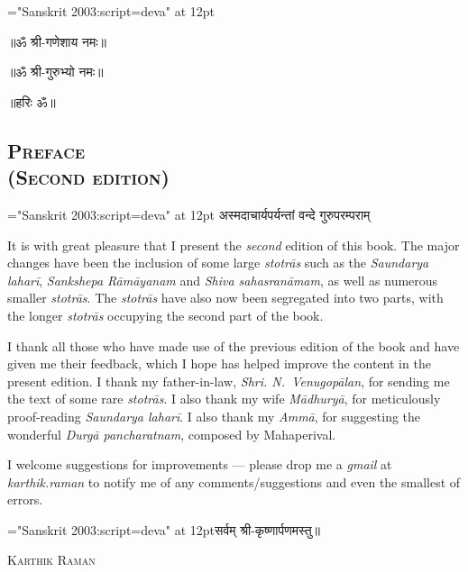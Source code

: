 {\font \x="Sanskrit 2003:script=deva" at 12pt\x
\centerline{॥ॐ श्री-गणेशाय नमः॥}
\centerline{॥ॐ श्री-गुरुभ्यो नमः॥}
\centerline{॥हरिः ॐ॥}
}
\thispagestyle{empty}

\begin{center}
\chapter*{\texorpdfstring{\scshape{Preface\\(Second edition)}}{Preface\\(Second edition)}}
\end{center}

{\font \x="Sanskrit 2003:script=deva" at 12pt\x
{}
{अस्मदाचार्यपर्यन्तां वन्दे गुरुपरम्पराम्}
}

It is with great pleasure that I present the \emph{second} edition of this book. The major changes  have been the inclusion of some large \emph{stotrās} such as the \emph{Saundarya laharī}, \emph{Sankshepa Rāmāyanam} and \emph{Shiva sahasranāmam}, as well as numerous smaller \emph{stotrās}. The \emph{stotrās} have also now been segregated into two parts, with the longer \emph{stotrās} occupying the second part of the book.

I thank all those who have made use of the previous edition of the book and have given me their feedback, which I hope has helped improve the content in the present edition. I thank my father-in-law, \textit{Shri. N.~Venugopālan}, for sending me the text of some rare \emph{stotrās}. I also thank my wife \textit{Mādhuryā}, for meticulously proof-reading \emph{Saundarya laharī}. I also thank my \textit{Ammā}, for suggesting the wonderful \textit{Durgā pancharatnam}, composed by Mahaperival.

I welcome suggestions for improvements --- please drop me a \textit{gmail} at \textit{karthik.raman} to notify me of any comments/suggestions and even the smallest of errors.

\centerline{\font \x="Sanskrit 2003:script=deva" at 12pt\x सर्वम् श्री-कृष्णार्पणमस्तु॥}

\medskip
{} \hfill \textsc{Karthik Raman}
